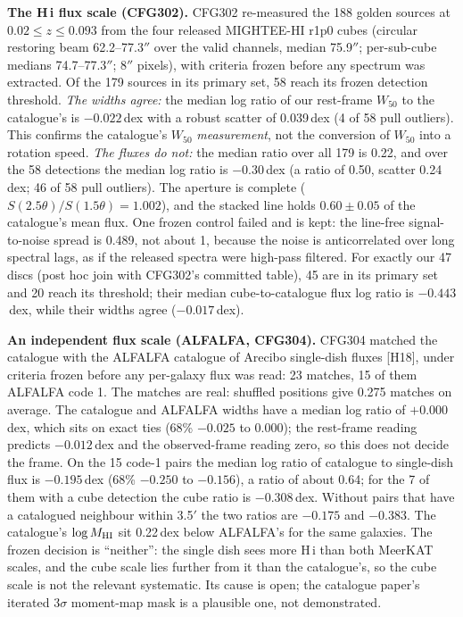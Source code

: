 \documentclass[10pt]{article}
\begin{document}
\textbf{The H\,{\sc i} flux scale (CFG302).} CFG302 re-measured the 188 golden sources at $0.02\le z\le0.093$ from the four released MIGHTEE-HI r1p0 cubes (circular restoring beam 62.2--77.3$''$ over the valid channels, median 75.9$''$; per-sub-cube medians 74.7--77.3$''$; 8$''$ pixels), with criteria frozen before any spectrum was extracted. Of the 179 sources in its primary set, 58 reach its frozen detection threshold. \emph{The widths agree:} the median log ratio of our rest-frame $W_{50}$ to the catalogue's is $-0.022$\,dex with a robust scatter of 0.039\,dex (4 of 58 pull outliers). This confirms the catalogue's $W_{50}$ \emph{measurement}, not the conversion of $W_{50}$ into a rotation speed. \emph{The fluxes do not:} the median ratio over all 179 is 0.22, and over the 58 detections the median log ratio is $-0.30$\,dex (a ratio of 0.50, scatter 0.24\,dex; 46 of 58 pull outliers). The aperture is complete ($S(2.5\theta)/S(1.5\theta)=1.002$), and the stacked line holds $0.60\pm0.05$ of the catalogue's mean flux. One frozen control failed and is kept: the line-free signal-to-noise spread is 0.489, not about 1, because the noise is anticorrelated over long spectral lags, as if the released spectra were high-pass filtered. For exactly our 47 discs (post hoc join with CFG302's committed table), 45 are in its primary set and 20 reach its threshold; their median cube-to-catalogue flux log ratio is $-0.443$\,dex, while their widths agree ($-0.017$\,dex).

\textbf{An independent flux scale (ALFALFA, CFG304).} CFG304 matched the catalogue with the ALFALFA catalogue of Arecibo single-dish fluxes [H18], under criteria frozen before any per-galaxy flux was read: 23 matches, 15 of them ALFALFA code 1. The matches are real: shuffled positions give 0.275 matches on average. The catalogue and ALFALFA widths have a median log ratio of $+0.000$\,dex, which sits on exact ties (68\% $-0.025$ to $0.000$); the rest-frame reading predicts $-0.012$\,dex and the observed-frame reading zero, so this does not decide the frame. On the 15 code-1 pairs the median log ratio of catalogue to single-dish flux is $-0.195$\,dex (68\% $-0.250$ to $-0.156$), a ratio of about 0.64; for the 7 of them with a cube detection the cube ratio is $-0.308$\,dex. Without pairs that have a catalogued neighbour within 3.5$'$ the two ratios are $-0.175$ and $-0.383$. The catalogue's $\log M_{\rm HI}$ sit 0.22\,dex below ALFALFA's for the same galaxies. The frozen decision is ``neither'': the single dish sees more H\,{\sc i} than both MeerKAT scales, and the cube scale lies further from it than the catalogue's, so the cube scale is not the relevant systematic. Its cause is open; the catalogue paper's iterated $3\sigma$ moment-map mask is a plausible one, not demonstrated.
\end{document}
